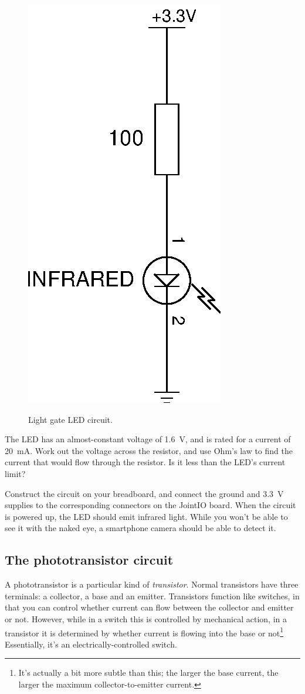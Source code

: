 \documentclass{article}
\begin{document}
\begin{figure}[h]
\centering
\includegraphics[width=.5\textwidth]{assets/fig/schem/ir-led}
\label{fig:schem:ir-led}
\caption{Light gate LED circuit.}
\end{figure}

The LED has an almost-constant voltage of \SI{1.6}{\volt}, and is rated for a
current of \SI{20}{\milli\ampere}. Work out the voltage across the resistor,
and use Ohm's law to find the current that would flow through the resistor. Is
it less than the LED's current limit?

Construct the circuit on your breadboard, and connect the ground and
\SI{3.3}{\volt} supplies to the corresponding connectors on the JointIO board.
When the circuit is powered up, the LED should emit infrared light. While you
won't be able to see it with the naked eye, a smartphone camera should be able
to detect it.

\subsection{The phototransistor circuit}

A phototransistor is a particular kind of \emph{transistor}. Normal transistors
have three terminals: a collector, a base and an emitter. Transistors function
like switches, in that you can control whether current can flow between the
collector and emitter or not. However, while in a switch this is controlled by
mechanical action, in a transistor it is determined by whether current is
flowing into the base or not\footnote{It's actually a bit more subtle than this;
the larger the base current, the larger the maximum collector-to-emitter
current.} Essentially, it's an electrically-controlled switch.
\end{document}
